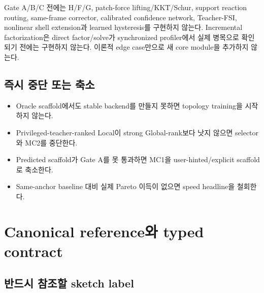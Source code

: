 \documentclass[10pt]{article}
\begin{document}
\begin{tcolorbox}[colback=StopLight,colframe=StopRed,title=V0 forbidden work,fonttitle=\bfseries]
Gate A/B/C 전에는 H/F/G, patch-force lifting/KKT/Schur, support reaction routing,
same-frame corrector, calibrated confidence network, Teacher-FSI, nonlinear shell extension과
learned hysteresis를 구현하지 않는다. Incremental factorization은 direct factor/solve가
synchronized profiler에서 실제 병목으로 확인되기 전에는 구현하지 않는다.
이론적 edge case만으로 새 core module을 추가하지 않는다.
\end{tcolorbox}

\subsection{즉시 중단 또는 축소}

\begin{itemize}
  \item Oracle scaffold에서도 stable backend를 만들지 못하면 topology training을 시작하지 않는다.
  \item Privileged-teacher-ranked Local이 strong Global-rank보다 낫지 않으면 selector와 MC2를 중단한다.
  \item Predicted scaffold가 Gate A를 못 통과하면 MC1을 user-hinted/explicit scaffold로 축소한다.
  \item Same-anchor baseline 대비 실제 Pareto 이득이 없으면 speed headline을 철회한다.
\end{itemize}

\section{Canonical reference와 typed contract}

\subsection{반드시 참조할 sketch label}
\end{document}

